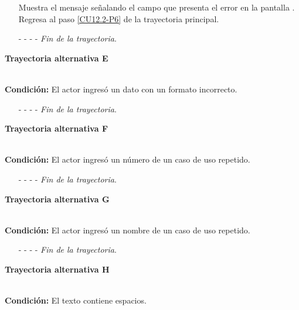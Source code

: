 \begin{enumerate}
	\UCpaso[\UCsist] Muestra el mensaje  señalando el campo que presenta el error en la pantalla .
	\UCpaso Regresa al paso \ref{CU12.2-P6} de la trayectoria principal.
	\item[- -] - - {\em {Fin de la trayectoria}}.%
\end{enumerate}
\hypertarget{CU12-2:TAE}{\textbf{Trayectoria alternativa E}}\\
\noindent \textbf{Condición:} El actor ingresó un dato con un formato incorrecto.
\begin{enumerate}
	\UCpaso[\UCsist] Muestra el mensaje  señalando el campo que presenta el error en la pantalla .
	\UCpaso Regresa al paso \ref{CU12.2-P6} de la trayectoria principal.
	\item[- -] - - {\em {Fin de la trayectoria}}.
\end{enumerate}
\hypertarget{CU12-2:TAF}{\textbf{Trayectoria alternativa F}}\\
\noindent \textbf{Condición:} El actor ingresó un número de un caso de uso repetido.
\begin{enumerate}
	\UCpaso[\UCsist] Muestra el mensaje  señalando el campo que presenta la duplicidad en la pantalla .
	\UCpaso Regresa al paso \ref{CU12.2-P6} de la trayectoria principal.
	\item[- -] - - {\em {Fin de la trayectoria}}.
\end{enumerate}
\hypertarget{CU12-2:TAG}{\textbf{Trayectoria alternativa G}}\\
\noindent \textbf{Condición:} El actor ingresó un nombre de un caso de uso repetido.
\begin{enumerate}
	\UCpaso[\UCsist] Muestra el mensaje  señalando el campo que presenta la duplicidad en la pantalla .
	\UCpaso Regresa al paso \ref{CU12.2-P6} de la trayectoria principal.
	\item[- -] - - {\em {Fin de la trayectoria}}.
\end{enumerate}
\hypertarget{CU12-2:TAH}{\textbf{Trayectoria alternativa H}}\\
\noindent \textbf{Condición:} El texto contiene espacios.
